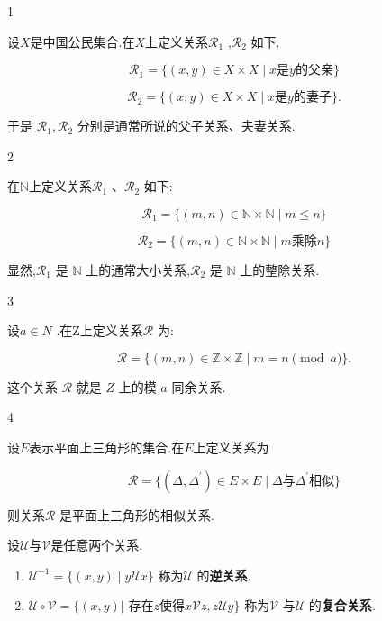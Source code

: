 \begin{sourceexample}{1}

设$X$是中国公民集合.在$X$上定义关系\(\mathscr{R}_1\) ,\(\mathscr{R}_2\) 如下.

\[
\mathscr{R}_1 = \{(x, y) \in X \times X \mid \text{$x$是$y$的父亲} \}
\]

\[\mathscr{R}_2 = \{(x, y) \in X \times X \mid \text{$x$是$y$的妻子} \}.
\]

于是 \(\mathscr{R}_1,\mathscr{R}_2\) 分别是通常所说的父子关系、夫妻关系.

\end{sourceexample}



\begin{sourceexample}{2}

在$\mathbb{N}$上定义关系\(\mathscr{R}_1\) 、\(\mathscr{R}_2\) 如下:

\[
\mathscr{R}_1 = \{ (m, n) \in \mathbb{N} \times \mathbb{N} \mid m \leq n \} 
\]

\[
\mathscr{R}_2 = \{ (m, n) \in \mathbb{N} \times \mathbb{N} \mid m \text{乘除} n \} 
\]

显然,\(\mathscr{R}_1\) 是 \(\mathbb{N}\) 上的通常大小关系,\(\mathscr{R}_2\) 是 \(\mathbb{N}\) 上的整除关系.

\end{sourceexample}



\begin{sourceexample}{3}

设\(a \in N\) .在Z上定义关系\(\mathscr{R}\) 为:

\[\mathscr{R} = \{(m, n) \in \mathbb{Z} \times \mathbb{Z} \mid m = n \pmod{a}\}.\]

这个关系 \(\mathscr{R}\) 就是 \(Z\) 上的模 \(a\) 同余关系.

\end{sourceexample}


\begin{sourceexample}{4}

设$E$表示平面上三角形的集合.在$E$上定义关系为

\[
\mathscr{R} = \{ (\Delta,\Delta^{\prime})\in E \times E \mid \Delta\text{与}\Delta^{\prime}\text{相似} \} 
\]

则关系\(\mathscr{R}\) 是平面上三角形的相似关系.
\end{sourceexample}



\begin{mydef*}{}

设\(\mathscr{U}\)与\(\mathscr{V}\)是任意两个关系.

\begin{enumerate}[label=\arabic*)]

\item
  \(\mathscr{U}^{-1} = \{(x, y) \mid y \mathscr{U} x\}\) 称为\(\mathscr{U}\) 的\textbf{逆关系}.
\item
  \(\mathscr{U} \circ \mathscr{V} = \{(x, y) |\) 存在$z$使得\(x\mathscr{V} z, z\mathscr{U} y \}\) 称为\(\mathscr{V}\) 与\(\mathscr{U}\) 的\textbf{复合关系}.
\end{enumerate}

\end{mydef*}

